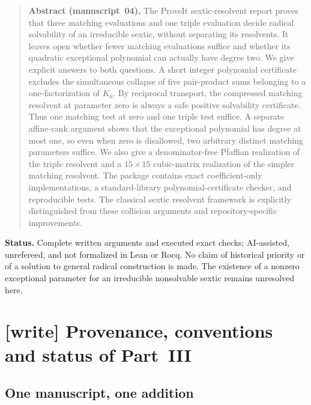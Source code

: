 \documentclass[11pt,letterpaper]{article}
\numberwithin{equation}{section}
\theoremstyle{definition}
\theoremstyle{remark}
\begin{document}
\begin{quote}\small
\textbf{Abstract (manuscript~04).}
The ProveIt sextic-resolvent report proves that three matching evaluations
and one triple evaluation decide radical solvability of an irreducible
sextic, without separating its resolvents. It leaves open whether fewer
matching evaluations suffice and whether its quadratic exceptional
polynomial can actually have degree two. We give explicit answers to both
questions. A short integer polynomial certificate excludes the simultaneous
collapse of five pair-product sums belonging to a one-factorization of
$K_6$. By reciprocal transport, the compressed matching resolvent at
parameter zero is always a safe positive solvability certificate. Thus one
matching test at zero and one triple test suffice. A separate affine-rank
argument shows that the exceptional polynomial has degree at most one,
so even when zero is disallowed, two arbitrary distinct matching parameters
suffice. We also give a denominator-free Pfaffian realization of the triple
resolvent and a $15\times15$ cubic-matrix realization of the simpler matching
resolvent. The package contains exact coefficient-only implementations,
a standard-library polynomial-certificate checker, and reproducible tests.
The classical sextic resolvent framework is explicitly distinguished from
these collision arguments and repository-specific improvements.
\end{quote}

\begin{resultbox}
\textbf{Status.} Complete written arguments and executed exact checks;
AI-assisted, unrefereed, and not formalized in Lean or Rocq.
No claim of historical priority or of a solution to general radical
construction is made. The existence of a nonzero exceptional parameter for
an irreducible nonsolvable sextic remains unresolved here.
\end{resultbox}

\section{[write] Provenance, conventions and status of Part~III}
\label{zpt:sec:write}

\subsection{One manuscript, one addition}
\label{zpt:sec:provenance}
\end{document}
